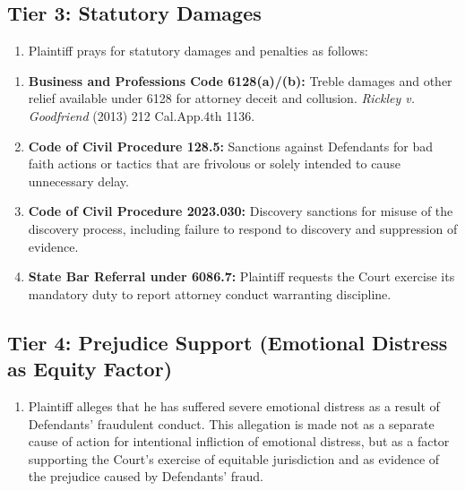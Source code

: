 \subsection{Tier 3: Statutory Damages}\label{tier-3-statutory-damages}

\begin{enumerate}
\def\labelenumi{\arabic{enumi}.}
\setcounter{enumi}{36}
\tightlist
\item
  Plaintiff prays for statutory damages and penalties as follows:
\end{enumerate}

\begin{enumerate}
\def\labelenumi{(\alph{enumi})}
\item
  \textbf{Business and Professions Code \textsection{} 6128(a)/(b):} Treble damages and other relief available under \textsection{} 6128 for attorney deceit and collusion. \emph{Rickley v. Goodfriend} (2013) 212 Cal.App.4th 1136.
\item
  \textbf{Code of Civil Procedure \textsection{} 128.5:} Sanctions against Defendants for bad faith actions or tactics that are frivolous or solely intended to cause unnecessary delay.
\item
  \textbf{Code of Civil Procedure \textsection{} 2023.030:} Discovery sanctions for misuse of the discovery process, including failure to respond to discovery and suppression of evidence.
\item
  \textbf{State Bar Referral under \textsection{} 6086.7:} Plaintiff requests the Court exercise its mandatory duty to report attorney conduct warranting discipline.
\end{enumerate}

\subsection{Tier 4: Prejudice Support (Emotional Distress as Equity Factor)}\label{tier-4-prejudice-support-emotional-distress-as-equity-factor}

\begin{enumerate}
\def\labelenumi{\arabic{enumi}.}
\setcounter{enumi}{37}
\tightlist
\item
  Plaintiff alleges that he has suffered severe emotional distress as a result of Defendants' fraudulent conduct. This allegation is made not as a separate cause of action for intentional infliction of emotional distress, but as a factor supporting the Court's exercise of equitable jurisdiction and as evidence of the prejudice caused by Defendants' fraud.
\end{enumerate}

